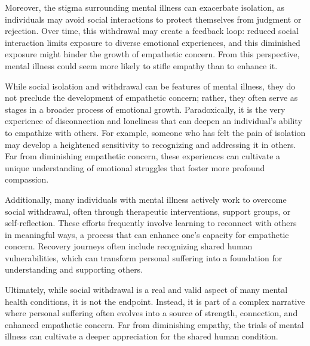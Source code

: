 \documentclass[stu]{apa7}
\begin{document}
Moreover, the stigma surrounding mental illness can exacerbate isolation, as individuals may avoid social interactions to protect themselves from judgment or rejection. Over time, this withdrawal may create a feedback loop: reduced social interaction limits exposure to diverse emotional experiences, and this diminished exposure might hinder the growth of empathetic concern. From this perspective, mental illness could seem more likely to stifle empathy than to enhance it.

While social isolation and withdrawal can be features of mental illness, they do not preclude the development of empathetic concern; rather, they often serve as stages in a broader process of emotional growth. Paradoxically, it is the very experience of disconnection and loneliness that can deepen an individual's ability to empathize with others. For example, someone who has felt the pain of isolation may develop a heightened sensitivity to recognizing and addressing it in others. Far from diminishing empathetic concern, these experiences can cultivate a unique understanding of emotional struggles that foster more profound compassion.

Additionally, many individuals with mental illness actively work to overcome social withdrawal, often through therapeutic interventions, support groups, or self-reflection. These efforts frequently involve learning to reconnect with others in meaningful ways, a process that can enhance one's capacity for empathetic concern. Recovery journeys often include recognizing shared human vulnerabilities, which can transform personal suffering into a foundation for understanding and supporting others.

Ultimately, while social withdrawal is a real and valid aspect of many mental health conditions, it is not the endpoint. Instead, it is part of a complex narrative where personal suffering often evolves into a source of strength, connection, and enhanced empathetic concern. Far from diminishing empathy, the trials of mental illness can cultivate a deeper appreciation for the shared human condition.


\end{document}
